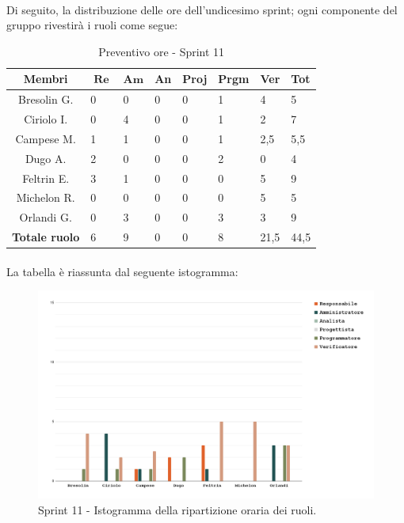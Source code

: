 \documentclass[10pt, a4paper]{article}
\begin{document}
{{{{{{{{{{{{{{{{{{\paragraph{}Di seguito, la distribuzione delle ore dell'undicesimo sprint; ogni componente del gruppo rivestirà i ruoli come segue:
\begin{table}[H]
\begin{tabularx}{\textwidth}{c|X|X|X|X|X|X|X}
        \textbf{Membri} & $\operatorname{\textbf{Re}}$ & $\mathrm{\textbf{Am}}$ & \textbf{An} & \textbf{Proj} & \textbf{Prgm} & \textbf{Ver} & \textbf{Tot} \\
        \hline Bresolin G. & 0 & 0 & 0 & 0 & 1 & \cellcolor{primarycolor}4 & 5 \\
        \hline Ciriolo I.  & 0 & \cellcolor{primarycolor}4 & 0 & 0 & 1 & 2 & 7 \\
        \hline Campese M.  & 1 & 1 & 0 & 0 & 1 & \cellcolor{primarycolor}2,5 & 5,5 \\
        \hline Dugo A.     & \cellcolor{primarycolor}2 & 0 & 0 & 0 & 2 & 0 & 4 \\
        \hline Feltrin E.  & 3 & 1 & 0 & 0 & 0 & \cellcolor{primarycolor}5 & 9 \\
        \hline Michelon R. & 0 & 0 & 0 & 0 & 0 & \cellcolor{primarycolor}5 & 5 \\
        \hline Orlandi G.  & 0 & 3 & 0 & 0 & \cellcolor{primarycolor}3 & 3 & 9 \\
        \hline
        \textbf{Totale ruolo} & 6 & 9 & 0 & 0 & 8 & 21,5 & 44,5 
    \end{tabularx}
    \caption{Preventivo ore - Sprint 11}
\end{table}

\paragraph{}La tabella è riassunta dal seguente istogramma:
\begin{figure}[H]
        \centering        
        \includegraphics[width=15.5cm]{istogrammi/istogramma_11_periodo.png}
        \caption{Sprint 11 - Istogramma della ripartizione oraria dei ruoli. }
\end{figure}

}}}}}}}}}}}}}}}}}}
\end{document}
